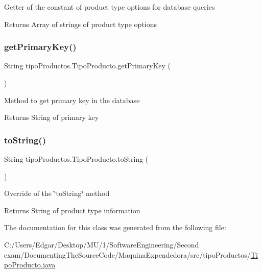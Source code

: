 Getter of the constant of product type options for database queries

\begin{DoxyReturn}{Returns}
Array of strings of product type options 
\end{DoxyReturn}
\mbox{\label{classtipo_productos_1_1_tipo_producto_aca3b6c0276f1694c3032a7a512ac0910}} 
\subsubsection{\texorpdfstring{get\+Primary\+Key()}{getPrimaryKey()}}
{\footnotesize\ttfamily String tipo\+Productos.\+Tipo\+Producto.\+get\+Primary\+Key (\begin{DoxyParamCaption}{ }\end{DoxyParamCaption})\hspace{0.3cm}{\ttfamily [inline]}}

Method to get primary key in the database

\begin{DoxyReturn}{Returns}
String of primary key 
\end{DoxyReturn}
\mbox{\label{classtipo_productos_1_1_tipo_producto_aae44943664780128543661f741a3089b}} 
\subsubsection{\texorpdfstring{to\+String()}{toString()}}
{\footnotesize\ttfamily String tipo\+Productos.\+Tipo\+Producto.\+to\+String (\begin{DoxyParamCaption}{ }\end{DoxyParamCaption})\hspace{0.3cm}{\ttfamily [inline]}}

Override of the \char`\"{}to\+String\char`\"{} method \begin{DoxyReturn}{Returns}
String of product type information 
\end{DoxyReturn}


The documentation for this class was generated from the following file\+:\begin{DoxyCompactItemize}
\item 
C\+:/\+Users/\+Edgar/\+Desktop/\+M\+U/1/\+Software\+Engineering/\+Second exam/\+Documenting\+The\+Source\+Code/\+Maquina\+Expendedora/src/tipo\+Productos/\mbox{\hyperlink{_tipo_producto_8java}{Tipo\+Producto.\+java}}\end{DoxyCompactItemize}
